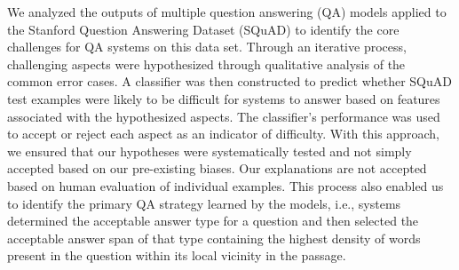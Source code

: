 We analyzed the outputs of multiple question answering (QA) models applied to the Stanford Question Answering Dataset (SQuAD) to identify the core challenges for QA systems on this data set. Through an iterative process, challenging aspects were hypothesized through qualitative analysis of the common error cases. A classifier was then constructed to predict whether SQuAD test examples were likely to be difficult for systems to answer based on features associated with the hypothesized aspects. The classifier's performance was used to accept or reject each aspect as an indicator of difficulty. With this approach, we ensured that our hypotheses were systematically tested and not simply accepted based on our pre-existing biases. Our explanations are not accepted based on human evaluation of individual examples. This process also enabled us to identify the primary QA strategy learned by the models, i.e., systems determined the acceptable answer type for a question and then selected the acceptable answer span of that type containing the highest density of words present in the question within its local vicinity in the passage.
